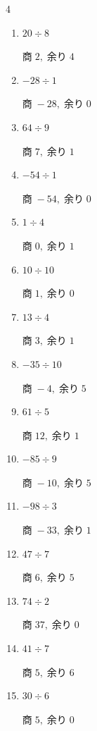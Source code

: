 \begin{multicols}{4}
\begin{enumerate}
        $商\; -3,\; 余り\; 9$

  \item $20 \div 8$

        $商\; 2,\; 余り\; 4$

  \item $-28 \div 1$

        $商\; -28,\; 余り\; 0$

  \item $64 \div 9$

        $商\; 7,\; 余り\; 1$

  \item $-54 \div 1$

        $商\; -54,\; 余り\; 0$

  \item $1 \div 4$

        $商\; 0,\; 余り\; 1$

  \item $10 \div 10$

        $商\; 1,\; 余り\; 0$

  \item $13 \div 4$

        $商\; 3,\; 余り\; 1$

  \item $-35 \div 10$

        $商\; -4,\; 余り\; 5$

  \item $61 \div 5$

        $商\; 12,\; 余り\; 1$

  \item $-85 \div 9$

        $商\; -10,\; 余り\; 5$

  \item $-98 \div 3$

        $商\; -33,\; 余り\; 1$

  \item $47 \div 7$

        $商\; 6,\; 余り\; 5$

  \item $74 \div 2$

        $商\; 37,\; 余り\; 0$

  \item $41 \div 7$

        $商\; 5,\; 余り\; 6$

  \item $30 \div 6$

        $商\; 5,\; 余り\; 0$


\end{enumerate}
\end{multicols}
